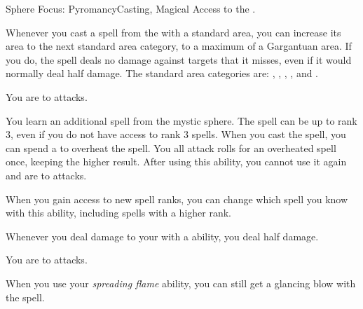   \begin{magicalfeat}{Sphere Focus: Pyromancy}{Casting, Magical}
    \featpre Access to the  .

     Whenever you cast a spell from the   with a standard area, you can increase its area to the next standard area category, to a maximum of a Gargantuan area.
    If you do, the spell deals no damage against targets that it misses, even if it would normally deal half damage.
    The standard area categories are: \smallarea, \medarea, \largearea, \hugearea, and \gargarea.

     You are  to \atFire attacks.

     You learn an additional spell from the  mystic sphere.
    The spell can be up to rank 3, even if you do not have access to rank 3 spells.
    When you cast the spell, you can spend a  to  overheat the spell.
    You  all attack rolls for an overheated spell once, keeping the higher result.
    After using this ability, you  cannot use it again and are \vulnerable to \atCold attacks.

    When you gain access to new spell ranks, you can change which spell you know with this ability, including spells with a higher rank.

     Whenever you deal damage to your  with a \atFire ability, you deal half damage.

     You are  to \atFire attacks.

     When you use your \textit{spreading flame} ability, you can still get a glancing blow with the spell.
  \end{magicalfeat}

